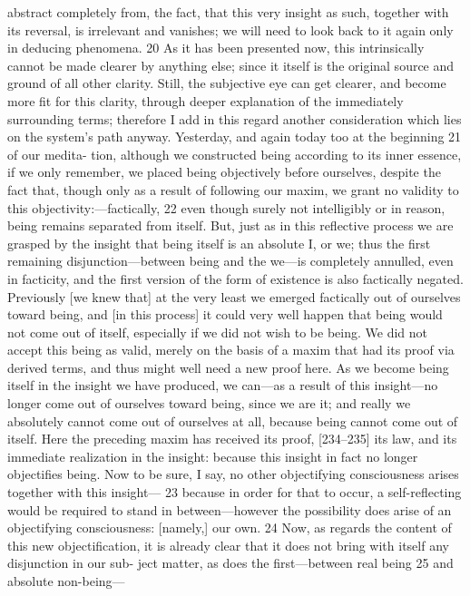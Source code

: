 abstract completely from, the fact, that this very insight as such, together with
its reversal, is irrelevant and vanishes; we will need to look back to it again only
in deducing phenomena. 20
As it has been presented now, this intrinsically cannot be made clearer
by anything else; since it itself is the original source and ground of all other
clarity. Still, the subjective eye can get clearer, and become more fit for this
clarity, through deeper explanation of the immediately surrounding terms;
therefore I add in this regard another consideration which lies on the system’s
path anyway. Yesterday, and again today too at the beginning 21 of our medita-
tion, although we constructed being according to its inner essence, if we only
remember, we placed being objectively before ourselves, despite the fact that,
though only as a result of following our maxim, we grant no validity to this
objectivity:—factically, 22 even though surely not intelligibly or in reason, being
remains separated from itself. But, just as in this reflective process we are
grasped by the insight that being itself is an absolute I, or we; thus the first
remaining disjunction—between being and the we—is completely annulled,
even in facticity, and the first version of the form of existence is also factically
negated. Previously [we knew that] at the very least we emerged factically out
of ourselves toward being, and [in this process] it could very well happen that
being would not come out of itself, especially if we did not wish to be being.
We did not accept this being as valid, merely on the basis of a maxim that had
its proof via derived terms, and thus might well need a new proof here. As we
become being itself in the insight we have produced, we can—as a result of
this insight—no longer come out of ourselves toward being, since we are it;
and really we absolutely cannot come out of ourselves at all, because being
cannot come out of itself. Here the preceding maxim has received its proof,
[234–235] its law, and its immediate realization in the insight: because this
insight in fact no longer objectifies being. Now to be sure, I say, no other
objectifying consciousness arises together with this insight— 23 because in
order for that to occur, a self-reflecting would be required to stand in
between—however the possibility does arise of an objectifying consciousness:
[namely,] our own. 24 Now, as regards the content of this new objectification,
it is already clear that it does not bring with itself any disjunction in our sub-
ject matter, as does the first—between real being 25 and absolute non-being—
